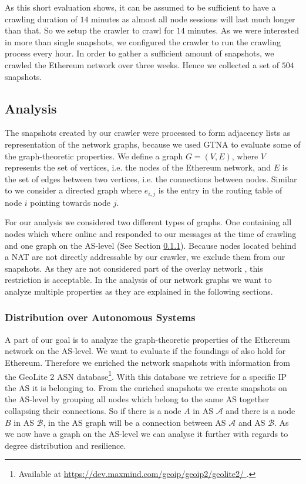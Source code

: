 \documentclass[10pt,conference,final]{IEEEtran}
\begin{document}
As this short evaluation shows, it can be assumed to be sufficient to have a crawling duration of $14$ minutes as almost all node sessions will last much longer than that.
So we setup the crawler to crawl for $14$ minutes.
As we were interested in more than single snapshots, we configured the crawler to run the crawling process every hour.
In order to gather a sufficient amount of snapshots, we crawled the Ethereum network over three weeks.
Hence we collected a set of $504$ snapshots.

\vspace{2mm}

\subsection{Analysis}
\label{sec:Analysis}
The snapshots created by our crawler were processed to form adjacency lists as representation of the network graphs, because we used GTNA to evaluate some of the graph-theoretic properties.
We define a graph \(G = (V,E)\), where \(V\) represents the set of vertices, i.e. the nodes of the Ethereum network, and \(E\) is the set of edges between two vertices, i.e. the connections between nodes.
Similar to \cite{18} we consider a directed graph where \(e_{i,j}\) is the entry in the routing table of node \(i\) pointing towards node \(j\).

For our analysis we considered two different types of graphs.
One containing all nodes which where online and responded to our messages at the time of crawling and one graph on the AS-level (See Section \ref{sec:AAS}).
Because nodes located behind a NAT are not directly addressable by our crawler, we exclude them from our snapshots.
As they are not considered part of the overlay network \cite{41}, this restriction is acceptable.
In the analysis of our network graphs we want to analyze multiple properties as they are explained in the following sections.

\vspace{2mm}

\subsubsection{Distribution over Autonomous Systems}
\label{sec:AAS}
A part of our goal is to analyze the graph-theoretic properties of the Ethereum network on the AS-level.
We want to evaluate if the foundings of \cite{36} also hold for Ethereum.
Therefore we enriched the network snapshots with information from the GeoLite 2 ASN database\footnote{Available at \url{https://dev.maxmind.com/geoip/geoip2/geolite2/ }.}.
With this database we retrieve for a specific IP the AS it is belonging to.
From the enriched snapshots we create snapshots on the AS-level by grouping all nodes which belong to the same AS together collapsing their connections.
So if there is a node \(A\) in AS \(\mathcal{A}\) and there is a node \(B\) in AS \(\mathcal{B}\), in the AS graph will be a connection between AS \(\mathcal{A}\) and AS \(\mathcal{B}\).
As we now have a graph on the AS-level we can analyse it further with regards to degree distribution and resilience.
\end{document}
